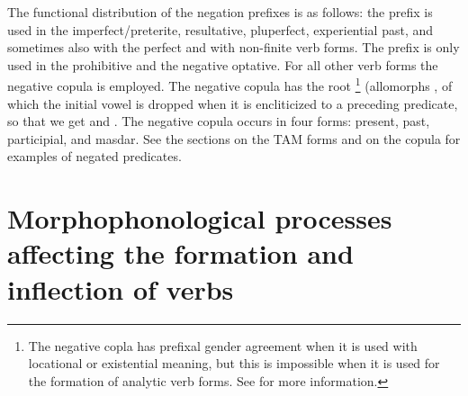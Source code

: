 The functional distribution of the negation prefixes is as follows: the prefix  is used in the imperfect/preterite, resultative, pluperfect, experiential past, and sometimes also with the perfect and with non-finite verb forms. The prefix  is only used in the prohibitive and the negative optative. For all other verb forms the negative copula is employed. The negative copula has the root \footnote{The negative copla has prefixal gender agreement when it is used with locational or existential meaning, but this is impossible when it is used for the formation of analytic verb forms. See  for more information.} (allomorphs , of which the initial vowel is dropped when it is encliticized to a preceding predicate, so that we get  and . The negative copula occurs in four forms: present, past, participial, and masdar. See the sections on the TAM forms and  on the copula for examples of negated predicates.



\section{Morphophonological processes affecting the formation and inflection of verbs}
\label{sec:Morphophonological processes affecting the formation and inflection of verbs}

